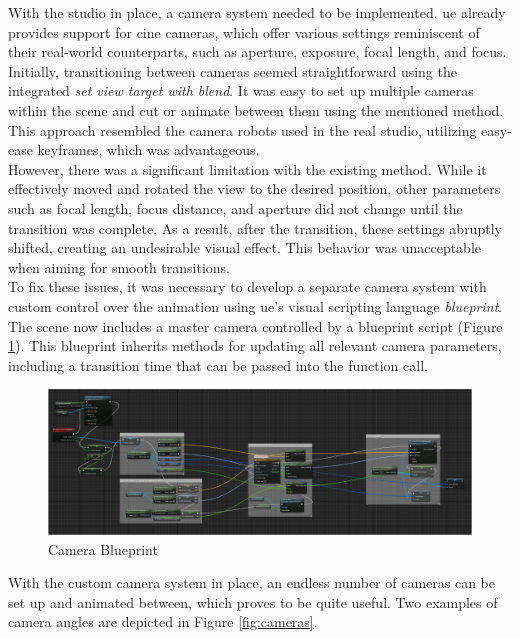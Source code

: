 \documentclass[
  a4paper,  %
  twoside,  %
  bibliography=totoc,
  headsepline,
  cleardoublepage=empty,
  parskip=half,
  draft=false
]{scrbook}
\begin{document}
With the studio in place, a camera system needed to be implemented. \gls{ue} already provides support for cine cameras, which offer various settings reminiscent of their real-world counterparts, such as aperture, exposure, focal length, and focus. Initially, transitioning between cameras seemed straightforward using the integrated \textit{set view target with blend}. It was easy to set up multiple cameras within the scene and cut or animate between them using the mentioned method. This approach resembled the camera robots used in the real studio, utilizing easy-ease keyframes, which was advantageous. \\
However, there was a significant limitation with the existing method. While it effectively moved and rotated the view to the desired position, other parameters such as focal length, focus distance, and aperture did not change until the transition was complete. As a result, after the transition, these settings abruptly shifted, creating an undesirable visual effect. This behavior was unacceptable when aiming for smooth transitions. \\
To fix these issues, it was necessary to develop a separate camera system with custom control over the animation using \gls{ue}'s visual scripting language \textit{blueprint}. The scene now includes a master camera controlled by a blueprint script (Figure \ref{fig:blueprint}). This blueprint inherits methods for updating all relevant camera parameters, including a transition time that can be passed into the function call. 
\begin{figure}[h]
  \centering
  \includegraphics[width=1\textwidth]{graphics/images/unreal-engine/blueprint.png}
  \caption{Camera Blueprint}
  \label{fig:blueprint}
\end{figure}
With the custom camera system in place, an endless number of cameras can be set up and animated between, which proves to be quite useful. Two examples of camera angles are depicted in Figure \ref{fig:cameras}.
\end{document}
